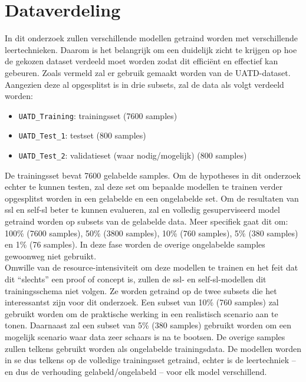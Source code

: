 \section{Dataverdeling}

In dit onderzoek zullen verschillende modellen getraind worden met verschillende leertechnieken. Daarom is het belangrijk om een duidelijk zicht te krijgen op hoe de gekozen dataset verdeeld moet worden zodat dit efficiënt en effectief kan gebeuren. Zoals vermeld zal er gebruik gemaakt worden van de UATD-dataset. Aangezien deze al opgesplitst is in drie subsets, zal de data als volgt verdeeld worden:

\begin{itemize}
    \item \texttt{UATD\_Training}: trainingsset (7600 samples)
    \item \texttt{UATD\_Test\_1}: testset (800 samples)
    \item \texttt{UATD\_Test\_2}: validatieset (waar nodig/mogelijk) (800 samples)
\end{itemize}

De trainingsset bevat 7600 gelabelde samples. Om de hypotheses in dit onderzoek echter te kunnen testen, zal deze set om bepaalde modellen te trainen verder opgesplitst worden in een gelabelde en een ongelabelde set. Om de resultaten van \gls{ssl} en \gls{self-sl} beter te kunnen evalueren, zal en volledig gesuperviseerd model getraind worden op subsets van de gelabelde data. Meer specifiek gaat dit om: 100\% (7600 samples), 50\% (3800 samples), 10\% (760 samples), 5\% (380 samples) en 1\% (76 samples). In deze fase worden de overige ongelabelde samples gewoonweg niet gebruikt. \\

Omwille van de resource-intensiviteit om deze modellen te trainen en het feit dat dit ``slechts'' een proof of concept is, zullen de \gls{ssl}- en \gls{self-sl}-modellen dit trainingsschema niet volgen. Ze worden getraind op de twee subsets die het interessantst zijn voor dit onderzoek. Een subset van 10\% (760 samples) zal gebruikt worden om de praktische werking in een realistisch scenario aan te tonen. Daarnaast zal een subset van 5\% (380 samples) gebruikt worden om een mogelijk scenario waar data zeer schaars is na te bootsen. De overige samples zullen telkens gebruikt worden als ongelabelde trainingsdata. De modellen worden in se dus telkens op de volledige trainingsset getraind, echter is de leertechniek -- en dus de verhouding gelabeld/ongelabeld -- voor elk model verschillend.

